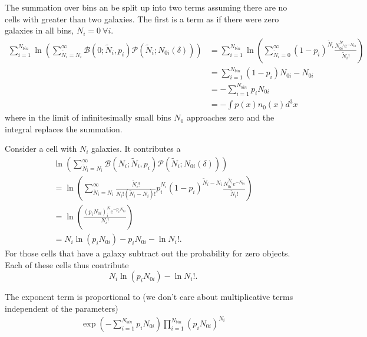 \documentclass{article}
\begin{document}
The summation over bins an be split up into two terms assuming there are no cells with greater than two galaxies.
The first is a term as if there were zero galaxies in all bins, $N_i=0\ \forall i$.
\begin{align}
 \sum_{i=1}^{N_{bin}} \ln{  \left( \sum_{\tilde{N}_i =N_i}^\infty  \mathcal{B}(0; \tilde{N}_i, p_i) \mathcal{P}(\tilde{N}_i ; N_{0i}(\delta))\right)} & =
\sum_{i=1}^{N_{bin}} \ln{  \left( \sum_{\tilde{N}_i =0}^\infty   (1-p_i)^{ \tilde{N}_i} \frac{N_{0i}^{\tilde{N}_i} e^{-N_{0i}}}{\tilde{N}_i!} \right)}\\ 
& = \sum_{i=1}^{N_{bin}} (1-p_i)N_{0i} - N_{0i}\\
& = - \sum_{i=1}^{N_{bin}} p_i N_{0i}  \\
& = - \int  p(x) n_{0}(x) d^3x
\end{align}
where in the limit of  infinitesimally small bins $N_{0}$ approaches zero and
the integral replaces the summation.

Consider a cell with $N_i$ galaxies.  It contributes a 
\begin{align}
\ln{  \left( \sum_{\tilde{N}_i =N_i}^\infty  \mathcal{B}(N_i; \tilde{N}_i, p_i) \mathcal{P}(\tilde{N}_i ; N_{0i}(\delta))\right)}\\
= \ln{  \left( \sum_{\tilde{N}_i =N_i}^\infty \frac{\tilde{N}_i!}{N_i!(\tilde{N}_i-N_i)!}   p_i^{N_i} (1-p_i)^{ \tilde{N}_i-N_i} \frac{N_{0i}^{\tilde{N}_i} e^{-N_{0i}}}{\tilde{N}_i!} \right)}
 \\
 = \ln{  \left( \frac{(p_iN_{0i})^N_ie^{-p_iN_{0i}}}{N_i!}  \right)} \\
 =  N_i \ln{\left(  p_i  N_{0i} \right) } -p_i N_{0i} - \ln{N_i!}.
\end{align}
For those cells that have a galaxy subtract out the probability for zero objects.  Each of these cells thus contribute
\begin{equation}
 N_i \ln{\left(  p_i  N_{0i} \right) } - \ln{N_i!}.
\end{equation}

The exponent term is proportional to (we don't care about multiplicative terms independent of the parameters)
\begin{align}
\exp\left(- \sum_{i=1}^{N_{bin}} p_i N_{0i}  \right)
 \prod_{i=1}^{N_{bin}}  (p_i N_{0i})^{N_i} 
\end{align}
\end{document}
